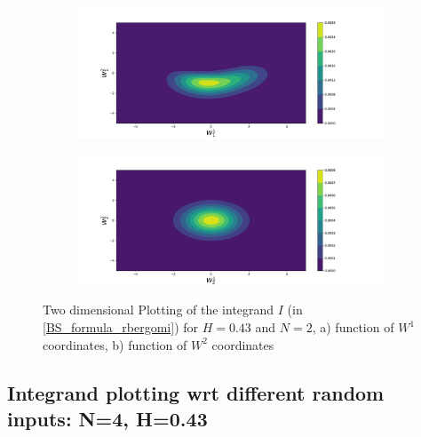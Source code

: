 \documentclass[11pt]{article}
\begin{document}
\begin{figure}[h!]
	\centering
	\begin{subfigure}{.5\textwidth}
		\centering
		\includegraphics[width=1\linewidth]{./figures/integrand_plotting_rBergomi/2D_plots/N_2/H_043/Bergomi_integrand_contours_K_1_H_043_W1_1_2_N_2}
		\caption{}
		\label{fig:sub3}
	\end{subfigure}%
	\begin{subfigure}{.5\textwidth}
		\centering
		\includegraphics[width=1\linewidth]{./figures/integrand_plotting_rBergomi/2D_plots/N_2/H_043/Bergomi_integrand_contours_K_1_H_043_W2_1_2_N_2}
		\caption{}
		\label{fig:sub4}
	\end{subfigure}
	\caption{Two dimensional Plotting of the integrand $I$ (in \eqref{BS_formula_rbergomi})  for $H=0.43$ and $N=2$, a)  function of $W^1$ coordinates, b) function of $W^2$ coordinates}
	\label{fig:Integrand_H_043_N_2_2D}
\end{figure}


\newpage
\subsection{Integrand plotting wrt different random inputs: N=4, H=0.43}\label{Appendix:Integrand plotting wrt different random inputs: N=4, H=0.43}
\end{document}
